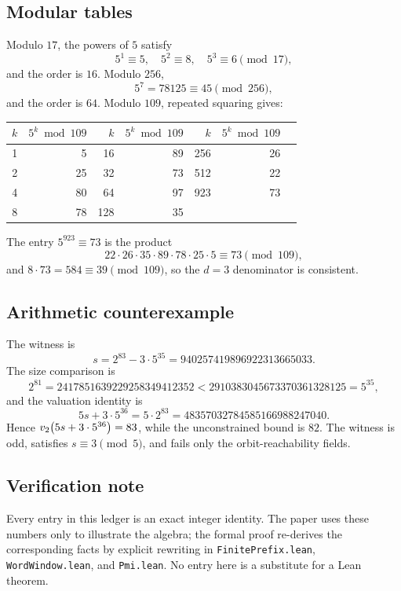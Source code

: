 \subsection{Modular tables}

Modulo $17$, the powers of $5$ satisfy
\begin{equation*}
  5^1\equiv5,\quad 5^2\equiv8,\quad 5^3\equiv6\pmod{17},
\end{equation*}
and the order is $16$.  Modulo $256$,
\begin{equation*}
  5^7=78125\equiv45\pmod{256},
\end{equation*}
and the order is $64$.  Modulo $109$, repeated squaring gives:
\begin{center}
\small
\begin{tabular}{@{}rrrrrrr@{}}
\toprule
$k$ & $5^k\bmod109$ & $k$ & $5^k\bmod109$ & $k$ & $5^k\bmod109$ \\
\midrule
1 & 5 & 16 & 89 & 256 & 26 \\
2 & 25 & 32 & 73 & 512 & 22 \\
4 & 80 & 64 & 97 & 923 & 73 \\
8 & 78 & 128 & 35 & & \\
\bottomrule
\end{tabular}
\end{center}
The entry $5^{923}\equiv73$ is the product
\begin{equation*}
  22\cdot26\cdot35\cdot89\cdot78\cdot25\cdot5
  \equiv73\pmod{109},
\end{equation*}
and $8\cdot73=584\equiv39\pmod{109}$, so the $d=3$ denominator is
consistent.

\subsection{Arithmetic counterexample}

The witness is
\begin{equation*}
  s=2^{83}-3\cdot5^{35}=940257419896922313665033.
\end{equation*}
The size comparison is
\begin{equation*}
  2^{81}=2417851639229258349412352
  <
  2910383045673370361328125=5^{35},
\end{equation*}
and the valuation identity is
\begin{equation*}
  5s+3\cdot5^{36}=5\cdot2^{83}=48357032784585166988247040.
\end{equation*}
Hence $v_2\!\left(5s+3\cdot5^{36}\right)=83$, while the unconstrained bound is
$82$.  The witness is odd, satisfies $s\equiv3\pmod5$, and fails only
the orbit-reachability fields.

\subsection{Verification note}

Every entry in this ledger is an exact integer identity.  The paper
uses these numbers only to illustrate the algebra; the formal proof
re-derives the corresponding facts by explicit rewriting in
\texttt{FinitePrefix.lean}, \texttt{WordWindow.lean}, and
\texttt{Pmi.lean}.  No entry here is a substitute for a Lean theorem.
